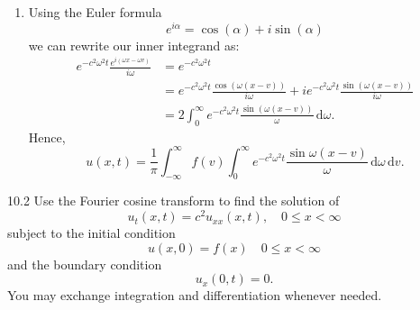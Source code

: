 \begin{derivation}
\begin{enumerate}[label=\alph*)]
\begin{align*}
                &= \frac{1}{\sqrt{2\pi}} \int_{-\infty}^{\infty} f(v) \left( \int_{-\infty}^{\infty} e^{-c^2 \omega^2 t} \frac{e^{i \left( \omega x - \omega v \right)}}{i \omega} \, \mathrm{d}\omega \right) \, \mathrm{d}v
      .\end{align*}
    \item Using the Euler formula
      \begin{equation*}
        e^{i \alpha} = \cos(\alpha) + i \sin (\alpha) 
      \end{equation*}
      we can rewrite our inner integrand as:
      \begin{align*}
        e^{-c^2 \omega^2 t} \frac{e^{i \left( \omega x - \omega v \right)}}{i \omega} &= e^{-c^2 \omega^2 t} \\
        &= e^{-c^2 \omega^2 t} \frac{\cos \left( \omega (x - v) \right)}{i \omega} + i e^{-c^2 \omega ^2 t} \frac{\sin \left( \omega \left( x - v \right) \right)}{i \omega} \\
        &= 2 \int_{0}^{\infty} e^{ - c^2 \omega^2 t} \frac{\sin (\omega (x - v))}{\omega } \, \mathrm{d}\omega
      .\end{align*}
      Hence,
      \begin{equation*}
        u(x,t) = \frac{1}{\pi} \int_{-\infty}^{\infty} f(v) \int_{0}^{\infty} e^{-c^2 \omega^2 t} \frac{\sin \omega (x - v)}{\omega} \, \mathrm{d}\omega \, \mathrm{d}v
      .\end{equation*}
  \end{enumerate}
\end{derivation}


\begin{problem}{10.2}
  Use the Fourier cosine transform to find the solution of
  \begin{equation*}
    u_t(x,t) = c^2 u_{x x}(x,t), \quad 0 \leq x < \infty
  \end{equation*}
  subject to the initial condition
  \begin{equation*}
    u(x,0) = f(x) \quad 0 \leq x < \infty
  \end{equation*}
  and the boundary condition
  \begin{equation*}
    u_x(0,t) = 0
  .\end{equation*}
  You may exchange integration and differentiation whenever needed.
\end{problem}

